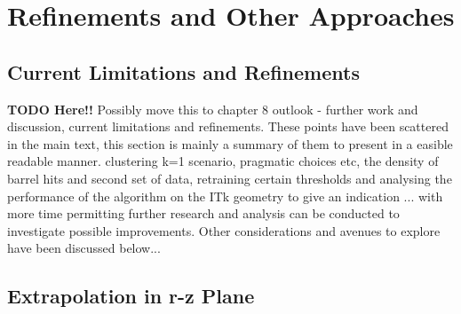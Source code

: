 











\section{Refinements and Other Approaches}


\subsection{Current Limitations and Refinements}

\textbf{TODO Here!!}
Possibly move this to chapter 8 outlook - further work and discussion, current limitations and refinements. These points have been scattered in the main text, this section is mainly a summary of them to present in a easible readable manner. 
clustering k=1 scenario, pragmatic choices etc, the density of barrel hits and second set of data, retraining certain thresholds and analysing the performance of the algorithm on the ITk geometry to give an indication ... with more time permitting further research and analysis can be conducted to investigate possible improvements. Other considerations and avenues to explore have been discussed below...



\subsection{Extrapolation in r-z Plane}


